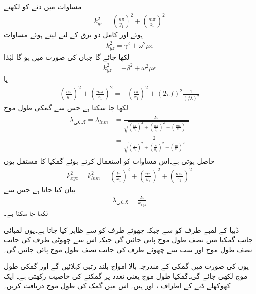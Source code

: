 مساوات  میں دئے  کو  لکھتے
\begin{align}
k_{yz}^2=\left( \frac{n \pi}{y_1}\right)^2+\left( \frac{m \pi}{z_1}\right)^2
\end{align}
ہوئے اور کامل ذو برق کے لئے  لیتے ہوئے  مساوات  
\begin{align*}
k_{yz}^2=\gamma^2+\omega^2 \mu \epsilon
\end{align*}
لکھا جائے گا جہاں  کی صورت میں  ہو گا لہٰذا
\begin{align*}
k_{yz}^2=-\beta^2+\omega^2 \mu \epsilon
\end{align*}
یا
\begin{align*}
\left( \frac{n \pi}{y_1}\right)^2+\left( \frac{m \pi}{z_1}\right)^2=-\left(\frac{l \pi}{x_1}\right)^2+\left(2\pi f\right)^2 \frac{1}{\left(f \lambda\right)^2}
\end{align*}
لکھا جا سکتا ہے جس سے گمکی طول موج
\begin{gather}
\begin{aligned}\label{مساوات_مویج_گمک_طول_موج}
\lambda_{\text{گمکی}}=\lambda_{lnm}&=
\frac{2\pi}{\sqrt{\left(\frac{l \pi}{x_1}\right)^2+\left( \frac{n \pi}{y_1}\right)^2+\left( \frac{m \pi}{z_1}\right)^+}}\\
&=\frac{2}{\sqrt{\left(\frac{l}{x_1}\right)^2+\left( \frac{n }{y_1}\right)^2+\left( \frac{m}{z_1}\right)^2}}
\end{aligned}
\end{gather}
حاصل ہوتی ہے۔اس مساوات کو استعمال کرتے ہوئے گمکیا کا مستقل  یوں
\begin{align}
k_{xyz}^2=k_{lnm}^2=\left(\frac{l \pi}{x_1}\right)^2+\left( \frac{n \pi}{y_1}\right)^2+\left( \frac{m \pi}{z_1}\right)^2
\end{align}
 بیان کیا جاتا ہے جس سے 
\begin{align}
\lambda_{\text{گمکی}}=\frac{2\pi}{k_{xyz}}
\end{align}
لکھا جا سکتا ہے۔

ڈبیا کے  لمبے طرف کو  سے  جبکہ چھوٹے طرف کو  سے ظاہر کیا جاتا ہے۔یوں لمبائی جانب گمکیا میں  نصف طول موج پائی جائیں گی جبکہ اس سے چھوٹی طرف کی جانب  نصف طول موج اور سب سے چھوٹے طرف کی جانب  نصف طول موج پائی جائیں گی۔

یوں  کی صورت میں گمکی کے مندرجہ بالا امواج بلند رتبی  کہلائیں گے اور گمکی طول موج  لکھی جائے گی۔گمکیا  طول موج یعنی  تعدد پر گمکنے کی خاصیت رکھتی ہے۔ 
ایک کھوکھلے ڈبے کے اطراف ،  اور  ہیں۔ اس میں  گمک کی طول موج  دریافت کریں۔

